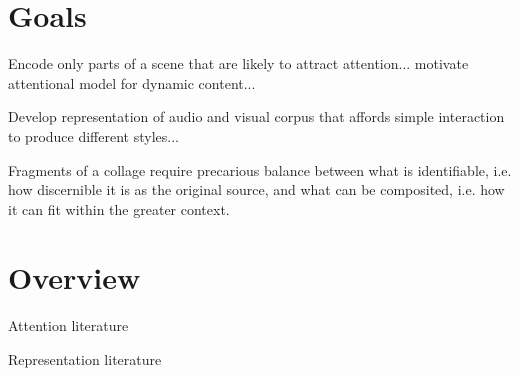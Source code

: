 \section{Goals}
Encode only parts of a scene that are likely to attract attention... motivate attentional model for dynamic content... 

Develop representation of audio and visual corpus that affords simple interaction to produce different styles...

Fragments of a collage require precarious balance between what is identifiable, i.e. how discernible it is as the original source, and what can be composited, i.e. how it can fit within the greater context. 

\section{Overview}
Attention literature

Representation literature

